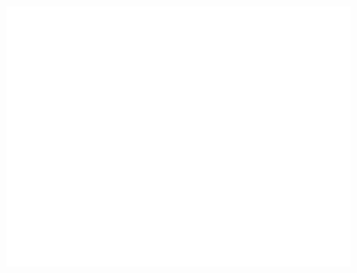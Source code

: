 \begin{figure}
    \centering
    \includegraphics{2Lay_q1spec_t150d00}
    \caption{}
    \label{fig:2Lay_q1spec_t150d00}
\end{figure}